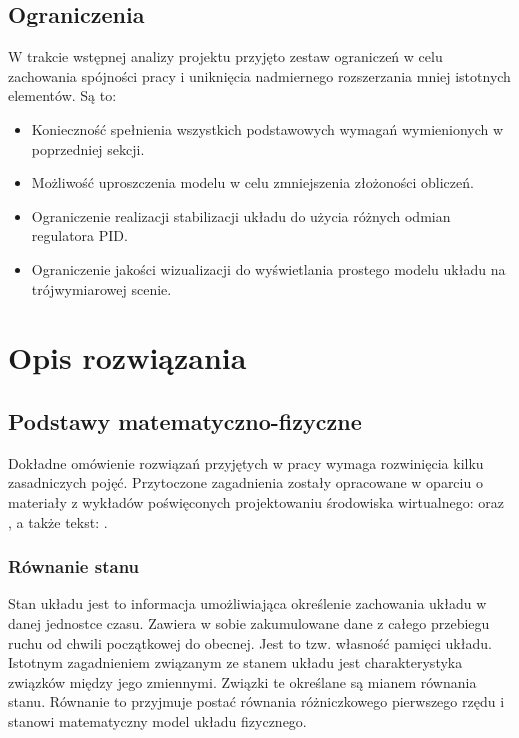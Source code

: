 \documentclass[12pt, oneside]{report}
\theoremstyle{definition}
\begin{document}
\section{Ograniczenia}
W trakcie wstępnej analizy projektu przyjęto zestaw ograniczeń w celu zachowania spójności pracy i uniknięcia nadmiernego rozszerzania mniej istotnych elementów. Są to:
\begin{itemize}
\item Konieczność spełnienia wszystkich podstawowych wymagań wymienionych w poprzedniej sekcji.
\item Możliwość uproszczenia modelu w celu zmniejszenia złożoności obliczeń.
\item Ograniczenie realizacji stabilizacji układu do użycia różnych odmian regulatora PID.
\item Ograniczenie jakości wizualizacji do wyświetlania prostego modelu układu na trójwymiarowej scenie.
\end{itemize}

\newpage
\chapter{Opis rozwiązania}
\section{Podstawy matematyczno-fizyczne}
Dokładne omówienie rozwiązań przyjętych w pracy wymaga rozwinięcia kilku zasadniczych pojęć. Przytoczone zagadnienia zostały opracowane w oparciu o materiały z wykładów poświęconych projektowaniu środowiska wirtualnego: \cite{MarciniakControlSystems} oraz \cite{MarciniakClosedLoop}, a także tekst: \cite{RungeKutta}.

\subsection{Równanie stanu}
\label{StateSpaceSubsection}
Stan układu jest to informacja umożliwiająca określenie zachowania układu w danej jednostce czasu. Zawiera w sobie zakumulowane dane z całego przebiegu ruchu od chwili początkowej do obecnej. Jest to tzw. własność pamięci układu. Istotnym zagadnieniem związanym ze stanem układu jest charakterystyka związków między jego zmiennymi. Związki te określane są mianem równania stanu. Równanie to przyjmuje postać równania różniczkowego pierwszego rzędu i stanowi matematyczny model układu fizycznego.
\end{document}
